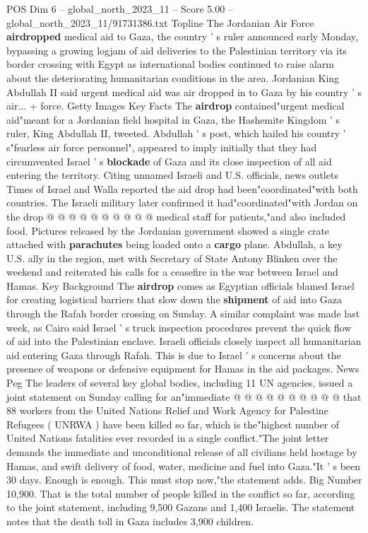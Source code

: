 \begin{textsample}{POS Dim 6 – global\_north\_2023\_11 – Score 5.00 – global\_north\_2023\_11/91731386.txt}  \label{ex:f6_pos_260}
Topline The Jordanian Air Force \textbf{airdropped} medical aid to Gaza, the country ' s ruler announced early Monday, bypassing a growing logjam of aid deliveries to the Palestinian territory via its border crossing with Egypt as international bodies continued to raise alarm about the deteriorating humanitarian conditions in the area.
Jordanian King Abdullah II said urgent medical aid was air dropped in to Gaza by his country ' s air... + force.
Getty Images Key Facts The \textbf{airdrop} contained"urgent medical aid"meant for a Jordanian field hospital in Gaza, the Hashemite Kingdom ' s ruler, King Abdullah II, tweeted.
Abdullah ' s post, which hailed his country ' s"fearless air force personnel", appeared to imply initially that they had circumvented Israel ' s \textbf{blockade} of Gaza and its close inspection of all aid entering the territory.
Citing unnamed Israeli and U.S. officials, news outlets Times of Israel and Walla reported the aid drop had been"coordinated"with both countries.
The Israeli military later confirmed it had"coordinated"with Jordan on the drop @ @ @ @ @ @ @ @ @ @ medical staff for patients,"and also included food.
Pictures released by the Jordanian government showed a single crate attached with \textbf{parachutes} being loaded onto a \textbf{cargo} plane.
Abdullah, a key U.S. ally in the region, met with Secretary of State Antony Blinken over the weekend and reiterated his calls for a ceasefire in the war between Israel and Hamas.
Key Background The \textbf{airdrop} comes as Egyptian officials blamed Israel for creating logistical barriers that slow down the \textbf{shipment} of aid into Gaza through the Rafah border crossing on Sunday.
A similar complaint was made last week, as Cairo said Israel ' s truck inspection procedures prevent the quick flow of aid into the Palestinian enclave.
Israeli officials closely inspect all humanitarian aid entering Gaza through Rafah.
This is due to Israel ' s concerns about the presence of weapons or defensive equipment for Hamas in the aid packages.
News Peg The leaders of several key global bodies, including 11 UN agencies, issued a joint statement on Sunday calling for an"immediate @ @ @ @ @ @ @ @ @ @ that 88 workers from the United Nations Relief and Work Agency for Palestine Refugees ( UNRWA ) have been killed so far, which is the"highest number of United Nations fatalities ever recorded in a single conflict."The joint letter demands the immediate and unconditional release of all civilians held hostage by Hamas, and swift delivery of food, water, medicine and fuel into Gaza."It ' s been 30 days.
Enough is enough.
This must stop now,"the statement adds.
Big Number 10,900.
That is the total number of people killed in the conflict so far, according to the joint statement, including 9,500 Gazans and 1,400 Israelis.
The statement notes that the death toll in Gaza includes 3,900 children.

\end{textsample}
